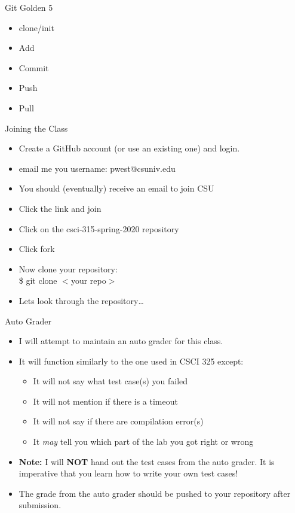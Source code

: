 \documentclass{beamer}
\begin{document}
\begin{frame}{Git Golden 5}
\begin{itemize}
\item clone/init
\item Add
\item Commit
\item Push
\item Pull
\end{itemize}
\end{frame}

\begin{frame}{Joining the Class}
\begin{itemize}
\item Create a GitHub account (or use an existing one) and login.
\item email me you username: pwest@csuniv.edu
\item You should (eventually) receive an email to join CSU
\item Click the link and join
\item Click on the csci-315-spring-2020 repository
\item Click fork
\item Now clone your repository:\\
\$ git clone $<$your repo$>$
\item Lets look through the repository\ldots
\end{itemize}
\end{frame}

\begin{frame}{Auto Grader}
\begin{itemize}
\item I will attempt to maintain an auto grader for this class.
\item It will function similarly to the one used in CSCI 325 except:
\begin{itemize}
\item It will not say what test case(s) you failed
\item It will not mention if there is a timeout
\item It will not say if there are compilation error(s)
\item It \textit{may} tell you which part of the lab you got right or wrong
\end{itemize}
\item \textbf{Note:} I will \textbf{NOT} hand out the test cases from the auto grader.  It is imperative that you learn how to write your own test cases!
\item The grade from the auto grader should be pushed to your repository after submission.
\end{itemize}
\end{frame}
\end{document}
